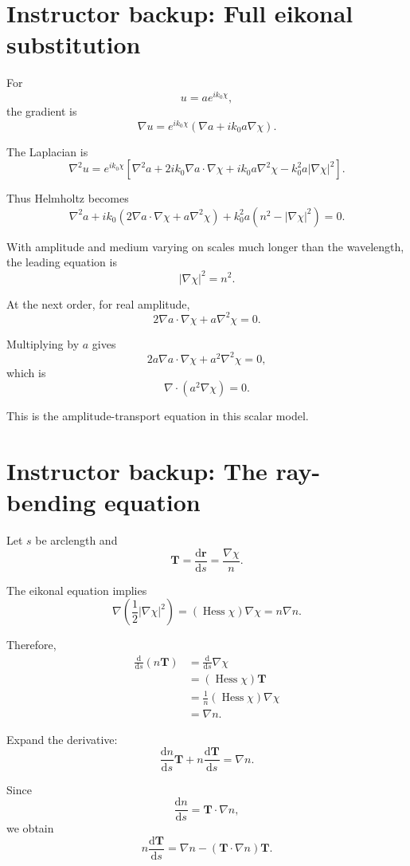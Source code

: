 \documentclass[11pt,a4paper]{article}
\newcommand{\dd}{\mathrm{d}}
\newcommand{\vr}{\mathbf{r}}
\newcommand{\vT}{\mathbf{T}}
\begin{document}
\section*{Instructor backup: Full eikonal substitution}

For
\[
u=a e^{ik_0\chi},
\]
the gradient is
\[
\nabla u
=
e^{ik_0\chi}
\left(
\nabla a+ik_0a\nabla\chi
\right).
\]

The Laplacian is
\[
\nabla^2u
=
e^{ik_0\chi}
\left[
\nabla^2a
+
2ik_0\nabla a\cdot\nabla\chi
+
ik_0a\nabla^2\chi
-
k_0^2a|\nabla\chi|^2
\right].
\]

Thus Helmholtz becomes
\[
\nabla^2a
+
ik_0
\left(
2\nabla a\cdot\nabla\chi+a\nabla^2\chi
\right)
+
k_0^2a
\left(
n^2-|\nabla\chi|^2
\right)
=
0.
\]

With amplitude and medium varying on scales much longer
than the wavelength, the leading equation is
\[
|\nabla\chi|^2=n^2.
\]

At the next order, for real amplitude,
\[
2\nabla a\cdot\nabla\chi+a\nabla^2\chi=0.
\]

Multiplying by \(a\) gives
\[
2a\nabla a\cdot\nabla\chi+a^2\nabla^2\chi=0,
\]
which is
\[
\boxed{
\nabla\cdot(a^2\nabla\chi)=0.
}
\]

This is the amplitude-transport equation in this
scalar model.

\section*{Instructor backup: The ray-bending equation}

Let \(s\) be arclength and
\[
\vT
=
\frac{\dd\vr}{\dd s}
=
\frac{\nabla\chi}{n}.
\]

The eikonal equation implies
\[
\nabla\left(\frac12|\nabla\chi|^2\right)
=
(\operatorname{Hess}\chi)\nabla\chi
=
n\nabla n.
\]

Therefore,
\begin{align*}
\frac{\dd}{\dd s}(n\vT)
&=
\frac{\dd}{\dd s}\nabla\chi\\
&=
(\operatorname{Hess}\chi)\vT\\
&=
\frac1n
(\operatorname{Hess}\chi)\nabla\chi\\
&=
\boxed{\nabla n}.
\end{align*}

Expand the derivative:
\[
\frac{\dd n}{\dd s}\vT
+
n\frac{\dd\vT}{\dd s}
=
\nabla n.
\]

Since
\[
\frac{\dd n}{\dd s}
=
\vT\cdot\nabla n,
\]
we obtain
\[
\boxed{
n\frac{\dd\vT}{\dd s}
=
\nabla n
-
(\vT\cdot\nabla n)\vT.
}
\]
\end{document}
